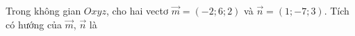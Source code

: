 \begin{ex}
Trong không gian $Oxyz$, cho hai vectơ $\vec m=(-2;6;2)$ và $\vec n=(1;-7;3)$. Tích có hướng của $\vec m$, $\vec n$ là
\end{ex}

